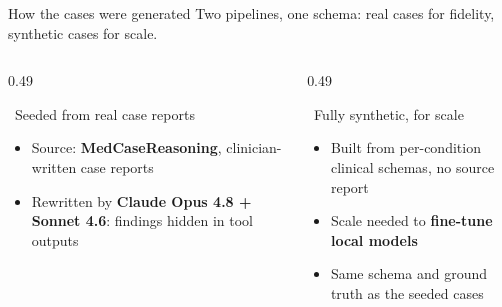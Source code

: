 \documentclass[aspectratio=169,t]{beamer}
\begin{document}
\begin{frame}{How the cases were generated}
  \centering\footnotesize\color{CERNtextdark}
  Two pipelines, one schema: real cases for fidelity, synthetic cases for scale.

  \vspace{1.5mm}
  \begin{columns}[T,onlytextwidth]
    \begin{column}{0.49\textwidth}
      \begin{block}{{\color{CERNblue}\faBookMedical}\;\, Seeded from real case reports}
        \footnotesize
        \begin{itemize}\setlength\itemsep{0.25em}
          \item Source: \textbf{MedCaseReasoning}, clinician-written case reports
          \item Rewritten by \textbf{Claude Opus 4.8 + Sonnet 4.6}: findings
                hidden in tool outputs
        \end{itemize}
      \end{block}
    \end{column}%
    \hfill
    \begin{column}{0.49\textwidth}
      \begin{alertblock}{{\color{CERNorange}\faRobot}\;\, Fully synthetic, for scale}
        \footnotesize
        \begin{itemize}\setlength\itemsep{0.25em}
          \item Built from per-condition clinical schemas, no source report
          \item Scale needed to \textbf{fine-tune local models}
          \item Same schema and ground truth as the seeded cases
        \end{itemize}
      \end{alertblock}
    \end{column}
  \end{columns}

\end{frame}
\end{document}
